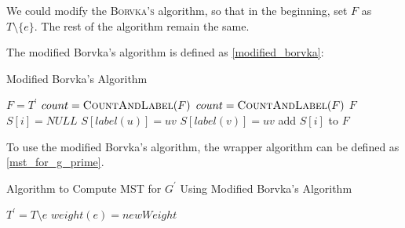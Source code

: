 \begin{homeworkProblem}
\begin{homeworkSubProblem}
We could modify the \textsc{Borvka's} algorithm,
so that in the beginning,
set $F$ as $T \setminus \{e\}$.
The rest of the algorithm remain the same.

The modified Borvka's algorithm is defined as \cref{modified_borvka}:

\begin{algorithm}[h]
    \caption{Modified Borvka's Algorithm}\label{modified_borvka}
    \begin{algorithmic}[1]
            \State $F = T^\prime$
            \State $count = \textsc{CountAndLabel} (F)$
                \State {}
                \State $count = \textsc{CountAndLabel} (F)$
            \EndWhile
            \Return $F$
        \EndProcedure
        \State
                \State $S[i] = NULL$
            \EndFor
                        \State $S[label(u)] = uv$
                    \EndIf
                        \State $S[label(v)] = uv$
                    \EndIf
                \EndIf
            \EndFor
                    \State add $S[i]$ to $F$
                \EndIf
            \EndFor
        \EndProcedure
    \end{algorithmic}
\end{algorithm}

\pagebreak
To use the modified Borvka's algorithm, the wrapper
algorithm can be defined as \cref{mst_for_g_prime}.

\begin{algorithm}[h]
    \caption{Algorithm to Compute MST for $G^\prime$ Using Modified Borvka's Algorithm}\label{mst_for_g_prime}
    \begin{algorithmic}[1]
            \State $T^\prime = T \setminus e$
            \State $weight(e) = newWeight$
            \Return {}
        \EndProcedure
    \end{algorithmic}
\end{algorithm}


\end{homeworkSubProblem}
\end{homeworkProblem}
